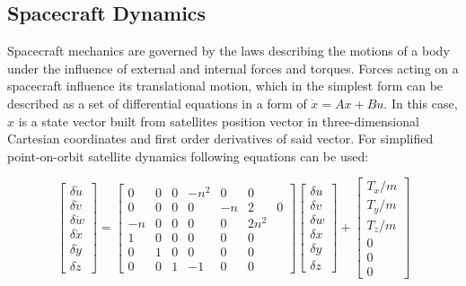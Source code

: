 \subsection{Spacecraft Dynamics}\label{sec:space_mechanics}
    Spacecraft mechanics are governed by the laws describing the motions of a body under the influence of external and internal forces and torques. Forces acting on a spacecraft influence its translational motion, which in the simplest form can be described as a set of differential equations in a form of $\dot{x} = Ax + Bu$. In this case, $x$ is a state vector built from satellites position vector in three-dimensional Cartesian coordinates and first order derivatives of said vector. For simplified point-on-orbit satellite dynamics following equations can be used:
    
    \begin{equation}
        \begin{bmatrix}  \delta\dot{u} \\ \delta\dot{v} \\ \delta\dot{w} \\ \delta\dot{x} \\ \delta\dot{y} \\ \delta\dot{z} \end{bmatrix}
        =
        \begin{bmatrix}
        0 & 0 & 0 & -n^2 & 0 & 0 \\
        0 & 0 & 0 & 0 & -n&2 & 0 \\
        -n & 0 & 0 & 0 & 0 & 2n^2 \\
        1 & 0 & 0 & 0 & 0 & 0 \\
        0 & 1 & 0 & 0 & 0 & 0 \\
        0 & 0 & 1 & -1 & 0 & 0
        \end{bmatrix}
        \begin{bmatrix}  \delta u \\ \delta v \\ \delta w \\ \delta x \\ \delta y \\ \delta z \end{bmatrix}
        +
        \begin{bmatrix}
        T_x/m \\
        T_y/m \\
        T_z/m \\
        0 \\
        0 \\
        0
        \end{bmatrix}
    \end{equation}\label{eqn:sstranslation}

